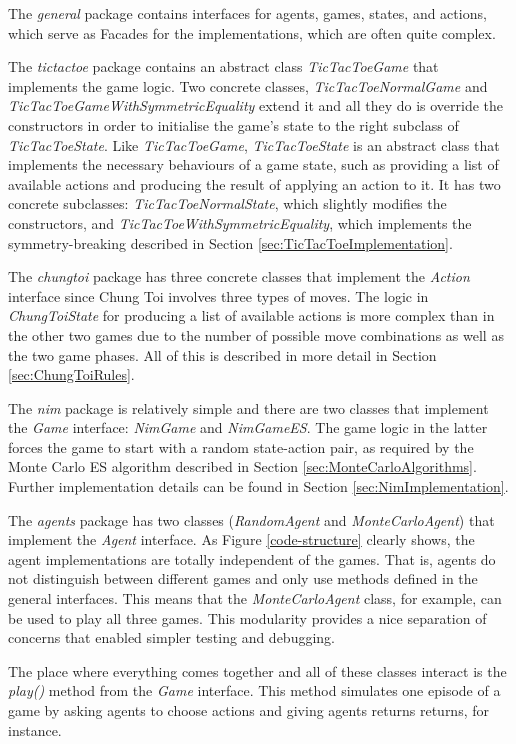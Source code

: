 \documentclass[11pt,a4paper]{report}
\begin{document}
The \emph{general} package contains interfaces for agents, games, states, and actions, which serve as Facades for the implementations, which are often quite complex.

The \emph{tictactoe} package contains an abstract class \emph{TicTacToeGame} that implements the game logic. Two concrete classes, \emph{TicTacToeNormalGame} and \emph{TicTacToeGameWithSymmetricEquality} extend it and all they do is override the constructors in order to initialise the game's state to the right subclass of \emph{TicTacToeState}. Like \emph{TicTacToeGame}, \emph{TicTacToeState} is an abstract class that implements the necessary behaviours of a game state, such as providing a list of available actions and producing the result of applying an action to it. It has two concrete subclasses: \emph{TicTacToeNormalState}, which slightly modifies the constructors, and \emph{TicTacToeWithSymmetricEquality}, which implements the symmetry-breaking described in Section \ref{sec:TicTacToeImplementation}.

The \emph{chungtoi} package has three concrete classes that implement the \emph{Action} interface since Chung Toi involves three types of moves. The logic in \emph{ChungToiState} for producing a list of available actions is more complex than in the other two games due to the number of possible move combinations as well as the two game phases. All of this is described in more detail in Section \ref{sec:ChungToiRules}.

The \emph{nim} package is relatively simple and there are two classes that implement the \emph{Game} interface: \emph{NimGame} and \emph{NimGameES}. The game logic in the latter forces the game to start with a random state-action pair, as required by the Monte Carlo ES algorithm described in Section \ref{sec:MonteCarloAlgorithms}. Further implementation details can be found in Section \ref{sec:NimImplementation}.

The \emph{agents} package has two classes (\emph{RandomAgent} and \emph{MonteCarloAgent}) that implement the \emph{Agent} interface. As Figure \ref{code-structure} clearly shows, the agent implementations are totally independent of the games. That is, agents do not distinguish between different games and only use methods defined in the general interfaces. This means that the \emph{MonteCarloAgent} class, for example, can be used to play all three games. This modularity provides a nice separation of concerns that enabled simpler testing and debugging.

The place where everything comes together and all of these classes interact is the \emph{play()} method from the \emph{Game} interface. This method simulates one episode of a game by asking agents to choose actions and giving agents returns returns, for instance.
\end{document}
